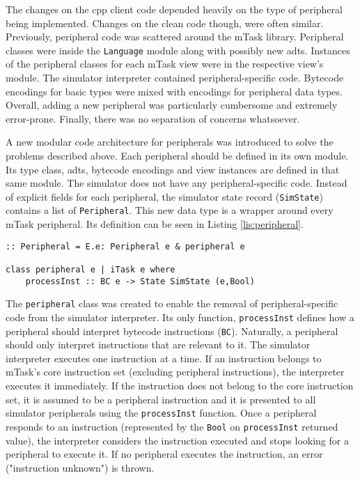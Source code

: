 The changes on the \gls{cpp} client code depended heavily on the type of peripheral being implemented. Changes on the \gls{clean} code though, were often similar. Previously, peripheral code was scattered around the \gls{mTask} library. Peripheral classes were inside the \texttt{Language} module along with possibly new \acsp{adt}. Instances of the peripheral classes for each \gls{mTask} view were in the respective view's module. The simulator interpreter contained peripheral-specific code. Bytecode encodings for basic types were mixed with encodings for peripheral data types. Overall, adding a new peripheral was particularly cumbersome and extremely error-prone. Finally, there was no separation of concerns whatsoever.

A new modular code architecture for peripherals was introduced to solve the problems described above. Each peripheral should be defined in its own module. Its type class, \acsp{adt}, bytecode encodings and view instances are defined in that same module. The simulator does not have any peripheral-specific code. Instead of explicit fields for each peripheral, the simulator state record (\texttt{SimState}) contains a list of \texttt{Peripheral}. This new data type is a wrapper around every \gls{mTask} peripheral. Its definition can be seen in Listing \ref{lis:peripheral}. 

\begin{lstlisting}[caption=The \texttt{Peripheral} class,captionpos=b,label=lis:peripheral]
:: Peripheral = E.e: Peripheral e & peripheral e

class peripheral e | iTask e where
	processInst :: BC e -> State SimState (e,Bool)
\end{lstlisting}

The \texttt{peripheral} class was created to enable the removal of peripheral-specific code from the simulator interpreter. Its only function, \texttt{processInst} defines how a peripheral should interpret bytecode instructions (\texttt{BC}). Naturally, a peripheral should only interpret instructions that are relevant to it. The simulator interpreter executes one instruction at a time. If an instruction belongs to \gls{mTask}'s core instruction set (excluding peripheral instructions), the interpreter executes it immediately. If the instruction does not belong to the core instruction set, it is assumed to be a peripheral instruction and it is presented to all simulator peripherals using the \texttt{processInst} function. Once a peripheral responds to an instruction (represented by the \texttt{Bool} on \texttt{processInst} returned value), the interpreter considers the instruction executed and stops looking for a peripheral to execute it. If no peripheral executes the instruction, an error ("instruction unknown") is thrown. 

